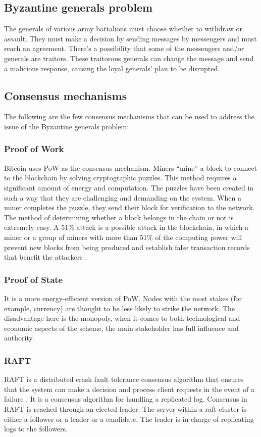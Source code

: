 \subsection{Byzantine generals problem}
The generals of various army battalions must choose whether to withdraw or assault. They must make a decision by sending messages by messengers and must reach an agreement. There's a possibility that some of the messengers and/or generals are traitors. These traitorous generals can change the message and send a malicious response, causing the loyal generals' plan to be disrupted.

\subsection{Consensus mechanisms}

The following are the few consensus mechanisms that can be used to address the issue of the Byzantine generals problem:

\subsubsection{Proof of Work} 
Bitcoin uses \ac{PoW} as the consensus mechanism. Miners “mine” a block to connect to the blockchain by solving cryptographic puzzles. This method requires a significant amount of energy and computation. The puzzles have been created in such a way that they are challenging and demanding on the system. When a miner completes the puzzle, they send their block for verification to the network. The method of determining whether a block belongs in the chain or not is extremely easy. A 51\% attack is a possible attack in the blockchain, in which a miner or a group of miners with more than 51\% of the computing power will prevent new blocks from being produced and establish false transaction records that benefit the attackers \cite{blockchain}.

\subsubsection{Proof of State}
It is a more energy-efficient version of \ac{PoW}. Nodes with the most stakes (for example, currency) are thought to be less likely to strike the network. The disadvantage here is the monopoly, when it comes to both technological and economic aspects of the scheme, the main stakeholder has full influence and authority.

\subsubsection{RAFT}
RAFT is a distributed crash fault tolerance consensus algorithm that ensures that the system can make a decision 
and process client requests in the event of a failure \cite{raft}. It is a consensus algorithm for handling a replicated log. 
Consensus in RAFT is reached through an elected leader. The server within a raft cluster is either a follower or a leader or a candidate. 
The leader is in charge of replicating logs to the followers.


